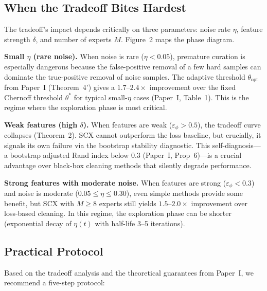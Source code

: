 \documentclass[12pt,a4paper]{article}
\begin{document}
\subsection{When the Tradeoff Bites Hardest}

The tradeoff's impact depends critically on three parameters: noise rate $\eta$, feature strength $\delta$, and number of experts $M$. Figure~2 maps the phase diagram.

\textbf{Small $\eta$ (rare noise).} When noise is rare ($\eta < 0.05$), premature curation is especially dangerous because the false-positive removal of a few hard samples can dominate the true-positive removal of noise samples. The adaptive threshold $\theta_{\text{opt}}$ from Paper~I (Theorem~4') gives a $1.7$--$2.4\times$ improvement over the fixed Chernoff threshold $\theta^*$ for typical small-$\eta$ cases (Paper~I, Table~1). This is the regime where the exploration phase is most critical.

\textbf{Weak features (high $\delta$).} When features are weak ($\varepsilon_\phi > 0.5$), the tradeoff curve collapses (Theorem~2). SCX cannot outperform the loss baseline, but crucially, it signals its own failure via the bootstrap stability diagnostic. This self-diagnosis---a bootstrap adjusted Rand index below 0.3 (Paper~I, Prop~6)---is a crucial advantage over black-box cleaning methods that silently degrade performance.

\textbf{Strong features with moderate noise.} When features are strong ($\varepsilon_\phi < 0.3$) and noise is moderate ($0.05 \leq \eta \leq 0.30$), even simple methods provide some benefit, but SCX with $M \geq 8$ experts still yields $1.5$--$2.0\times$ improvement over loss-based cleaning. In this regime, the exploration phase can be shorter (exponential decay of $\eta(t)$ with half-life 3--5 iterations).

\subsection{Practical Protocol}

Based on the tradeoff analysis and the theoretical guarantees from Paper~I, we recommend a five-step protocol:
\end{document}
